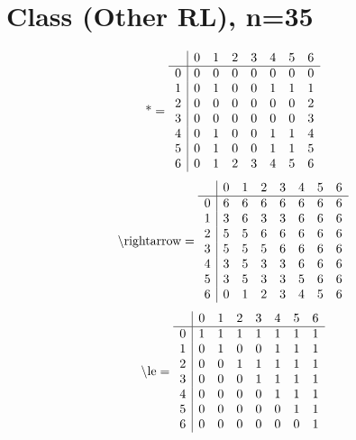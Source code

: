 \documentclass[11pt]{article}
\begin{document}
\section{Class (Other RL), n=35}
\[\text{*} = 
\begin{array}{r | r r r r r r r}
 & 0 & 1 & 2 & 3 & 4 & 5 & 6 \\ \hline
0 & 0 & 0 & 0 & 0 & 0 & 0 & 0 \\
1 & 0 & 1 & 0 & 0 & 1 & 1 & 1 \\
2 & 0 & 0 & 0 & 0 & 0 & 0 & 2 \\
3 & 0 & 0 & 0 & 0 & 0 & 0 & 3 \\
4 & 0 & 1 & 0 & 0 & 1 & 1 & 4 \\
5 & 0 & 1 & 0 & 0 & 1 & 1 & 5 \\
6 & 0 & 1 & 2 & 3 & 4 & 5 & 6 \\
\end{array}
\]
\[\text{\textbackslash rightarrow} = 
\begin{array}{r | r r r r r r r}
 & 0 & 1 & 2 & 3 & 4 & 5 & 6 \\ \hline
0 & 6 & 6 & 6 & 6 & 6 & 6 & 6 \\
1 & 3 & 6 & 3 & 3 & 6 & 6 & 6 \\
2 & 5 & 5 & 6 & 6 & 6 & 6 & 6 \\
3 & 5 & 5 & 5 & 6 & 6 & 6 & 6 \\
4 & 3 & 5 & 3 & 3 & 6 & 6 & 6 \\
5 & 3 & 5 & 3 & 3 & 5 & 6 & 6 \\
6 & 0 & 1 & 2 & 3 & 4 & 5 & 6 \\
\end{array}
\]
\[\text{\textbackslash le} = 
\begin{array}{r | r r r r r r r}
 & 0 & 1 & 2 & 3 & 4 & 5 & 6 \\ \hline
0 & 1 & 1 & 1 & 1 & 1 & 1 & 1 \\
1 & 0 & 1 & 0 & 0 & 1 & 1 & 1 \\
2 & 0 & 0 & 1 & 1 & 1 & 1 & 1 \\
3 & 0 & 0 & 0 & 1 & 1 & 1 & 1 \\
4 & 0 & 0 & 0 & 0 & 1 & 1 & 1 \\
5 & 0 & 0 & 0 & 0 & 0 & 1 & 1 \\
6 & 0 & 0 & 0 & 0 & 0 & 0 & 1 \\
\end{array}
\]
\end{document}
